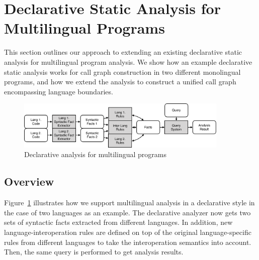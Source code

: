 
\section{Declarative Static Analysis for Multilingual Programs}
This section outlines our approach to extending an existing
declarative static analysis for multilingual program analysis.
We show how an example declarative static analysis works
for call graph construction in two different monolingual programs, and
how we extend the analysis to construct a unified call graph
encompassing language boundaries.

\begin{figure}[t]
  \centering
  \vspace{2mm}
  \includegraphics[width=0.9\textwidth]{img/ov2.pdf}
  \caption{Declarative analysis for multilingual programs}
  \label{fig:ov2}
\end{figure}

\subsection{Overview}
Figure~\ref{fig:ov2} illustrates how we support multilingual analysis in a
declarative style in the case of two languages as an example. The declarative
analyzer now gets two sets of syntactic facts extracted from different
languages. In addition, new language-interoperation rules are defined on top of
the original language-specific rules from different languages to take the
interoperation semantics into account. Then, the same query is performed to get
analysis results.

